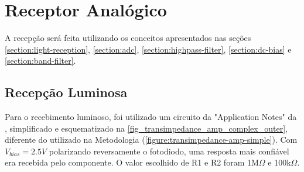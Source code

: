 	\section{Receptor Analógico}
	
	A recepção será feita utilizando os conceitos apresentados nas seções \ref{section:light-reception}, \ref{section:adc},  \ref{section:highpass-filter}, \ref{section:dc-bias} e \ref{section:band-filter}.
	
	\subsection{Recepção Luminosa}
	Para o recebimento luminoso, foi utilizado um circuito da "Application Notes" da \cite{datasheet-opa380}, simplificado e esquematizado na \autoref{fig_transimpedance_amp_complex_outer}, diferente do utilizado na Metodologia (\autoref{figure:transimpedance-amp-simple}). Com $V_{bias} = 2.5V$ polarizando reversamente o fotodiodo, uma resposta mais confiável era recebida pelo componente. O valor escolhido de R1 e R2 foram  1M$\Omega$ e 100k$\Omega$.
	
